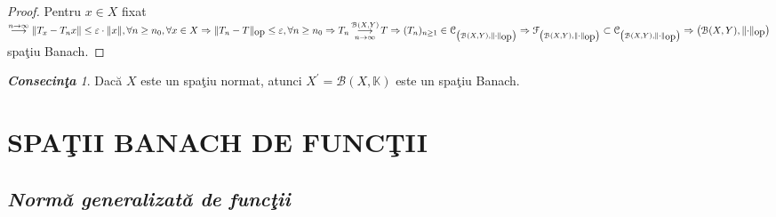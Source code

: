 \documentclass[ a4paper, 12pt]{report}
\theoremstyle{definition}
\theoremstyle{remark}
\newtheorem{cons}{\bf Consecin\c ta }[section]
\numberwithin{equation}{section}
\begin{document}
\begin{proof}
Pentru $x \in X$ fixat $\stackrel{n \rightarrow \infty}{\longrightarrow}  \lVert T_x - T_n x \rVert \leq \varepsilon \cdot  \lVert x \rVert, \forall n \geq n_0, \forall x \in X \Rightarrow  \lVert T_n - T \rVert_{\mbox{op}} \leq \varepsilon, \forall n \geq n_0 \Rightarrow T_n \pound\limits_{n \rightarrow \infty}^{\mathcal{B}(X,Y)} T \Rightarrow (T_n)_{n \geq 1} \in \mathcal{C}_{\left( \mathcal{B}(X,Y),  \lVert \cdot \rVert_{\mbox{op}}\right)} \Rightarrow \mathcal{F}_{\left( \mathcal{B}(X,Y),  \lVert \cdot \rVert_{\mbox{op}}\right)} \subset \mathcal{C}_{\left( \mathcal{B}(X,Y),  \lVert \cdot \rVert_{\mbox{op}}\right)} \Rightarrow \left( \mathcal{B}(X,Y),  \lVert \cdot \rVert_{\mbox{op}}\right) $ spa\c tiu Banach. 



\end{proof}
\begin{cons}
Dac\u a $X$ este un spa\c tiu normat, atunci $X^{'} = \mathcal{B}(X,\mathbb{K})$ este un spa\c tiu Banach.
\end{cons}








\newpage
\chapter{SPA\c TII BANACH DE FUNC\c TII}
\vspace{5mm}

\section{\textit{Norm\u a generalizat\u a de func\c tii}}
\end{document}
